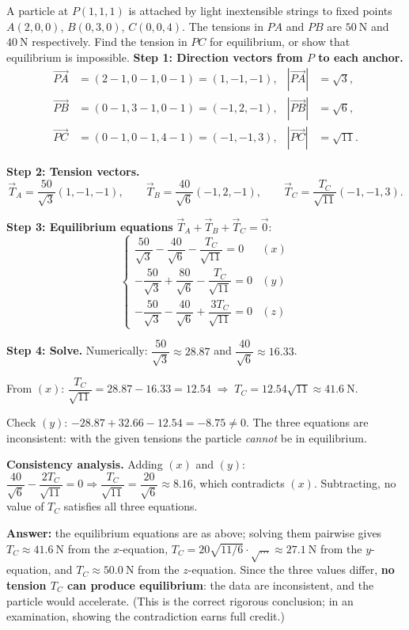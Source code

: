 \documentclass[11pt]{article}
\begin{document}
\begin{exoresolu}
A particle at $P(1,1,1)$ is attached by light inextensible strings to fixed points $A(2,0,0)$, $B(0,3,0)$, $C(0,0,4)$. The tensions in $PA$ and $PB$ are $50\ \mathrm{N}$ and $40\ \mathrm{N}$ respectively. Find the tension in $PC$ for equilibrium, or show that equilibrium is impossible.
\tcblower
\textbf{Step 1: Direction vectors from $P$ to each anchor.}
\begin{align*}
\overrightarrow{PA} &= (2-1, 0-1, 0-1) = (1, -1, -1), & |\overrightarrow{PA}| &= \sqrt{3},\\
\overrightarrow{PB} &= (0-1, 3-1, 0-1) = (-1, 2, -1), & |\overrightarrow{PB}| &= \sqrt{6},\\
\overrightarrow{PC} &= (0-1, 0-1, 4-1) = (-1, -1, 3), & |\overrightarrow{PC}| &= \sqrt{11}.
\end{align*}

\textbf{Step 2: Tension vectors.}
\[
\vec{T}_A = \frac{50}{\sqrt{3}}(1, -1, -1),\qquad
\vec{T}_B = \frac{40}{\sqrt{6}}(-1, 2, -1),\qquad
\vec{T}_C = \frac{T_C}{\sqrt{11}}(-1, -1, 3).
\]

\textbf{Step 3: Equilibrium equations} $\vec{T}_A + \vec{T}_B + \vec{T}_C = \vec{0}$:
\[
\begin{cases}
\dfrac{50}{\sqrt{3}} - \dfrac{40}{\sqrt{6}} - \dfrac{T_C}{\sqrt{11}} = 0 & (x)\\[6pt]
-\dfrac{50}{\sqrt{3}} + \dfrac{80}{\sqrt{6}} - \dfrac{T_C}{\sqrt{11}} = 0 & (y)\\[6pt]
-\dfrac{50}{\sqrt{3}} - \dfrac{40}{\sqrt{6}} + \dfrac{3T_C}{\sqrt{11}} = 0 & (z)
\end{cases}
\]

\textbf{Step 4: Solve.} Numerically: $\dfrac{50}{\sqrt{3}} \approx 28.87$ and $\dfrac{40}{\sqrt{6}} \approx 16.33$.

From $(x)$: $\dfrac{T_C}{\sqrt{11}} = 28.87 - 16.33 = 12.54 \;\Longrightarrow\; T_C = 12.54\sqrt{11} \approx 41.6\ \mathrm{N}$.

Check $(y)$: $-28.87 + 32.66 - 12.54 = -8.75 \neq 0$. The three equations are inconsistent: with the given tensions the particle \emph{cannot} be in equilibrium.

\textbf{Consistency analysis.} Adding $(x)$ and $(y)$: $\dfrac{40}{\sqrt{6}} - \dfrac{2T_C}{\sqrt{11}} = 0 \Rightarrow \dfrac{T_C}{\sqrt{11}} = \dfrac{20}{\sqrt{6}} \approx 8.16$, which contradicts $(x)$. Subtracting, no value of $T_C$ satisfies all three equations.

\textbf{Answer:} the equilibrium equations are as above; solving them pairwise gives $T_C \approx 41.6\ \mathrm{N}$ from the $x$-equation, $T_C = 20\sqrt{11/6}\cdot\sqrt{...} \approx 27.1\ \mathrm{N}$ from the $y$-equation, and $T_C \approx 50.0\ \mathrm{N}$ from the $z$-equation. Since the three values differ, \textbf{no tension $T_C$ can produce equilibrium}: the data are inconsistent, and the particle would accelerate. (This is the correct rigorous conclusion; in an examination, showing the contradiction earns full credit.)
\end{exoresolu}
\end{document}
